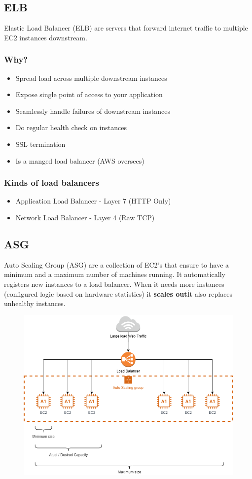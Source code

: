 \subsection{ELB}\label{subsec:elb}
Elastic Load Balancer (ELB) are servers that forward internet traffic to multiple EC2 instances downstream.

\subsubsection{Why?}
\begin{itemize}
	\item{Spread load across multiple downstream instances}
	\item{Expose single point of access to your application}
	\item{Seamlessly handle failures of downstream instances}
	\item{Do regular health check on instances}
	\item{SSL termination}
	\item{Is a manged load balancer (AWS oversees)} 
\end{itemize}

\subsubsection{Kinds of load balancers}
\begin{itemize}
	\item{Application Load Balancer} - Layer 7 (HTTP Only)
	\item{Network Load Balancer} - Layer 4 (Raw TCP)
\end{itemize}

\subsection{ASG}\label{subsec:asg}
Auto Scaling Group (ASG) are a collection of EC2's that ensure to have a minimum and a maximum number of machines running.
It automatically registers new instances to a load balancer.
When it needs more instances (configured logic based on hardware statistics) it \textbf{scales out}\.
It also replaces unhealthy instances.

\begin{figure}[h]
\includegraphics[scale=0.5]{elb_asg/elb_asg}
\centering\label{fig:elb_asg}
\end{figure}
